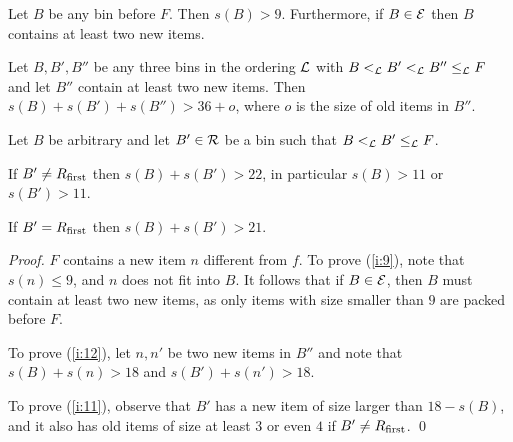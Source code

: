 \begin{lem}
\label{l:aux}
\begin{compactenum}[(i)]
\item
\label{i:9}
Let $B$ be any bin before $F$. Then $s(B)>9$. Furthermore, if
$B\in{\mathcal E}$ then $B$ contains at least two new items.
\item
\label{i:12}
Let $B,B',B''$ be any three bins in the ordering ${\mathcal L}$ with
$B <_{{\mathcal L}} B' <_{{\mathcal L}} B'' \leq_{{\mathcal L}} F$ and let $B''$ contain at least two new items. Then
$s(B)+s(B')+s(B'')>36+o$, where $o$ is the size of old items in $B''$.
\item  
\label{i:11}
Let $B$ be arbitrary and let $B'\in{\mathcal R}$ be a bin such that $B <_{{\mathcal L}} B' \leq_{{\mathcal L}} F$.

If $B'\neq R_{\mbox{\rm\scriptsize first}}$ then $s(B)+s(B')>22$, in
particular $s(B)>11$ or $s(B')>11$.

If $B'=R_{\mbox{\rm\scriptsize first}}$ then $s(B)+s(B')>21$.
\end{compactenum}
\end{lem}

\begin{proof}
$F$ contains a new item $n$ different from $f$. To prove (\ref{i:9}),
  note that $s(n)\leq 9$, and $n$ does not fit into $B$. It follows
  that if $B\in{\mathcal E}$, then $B$ must contain at least two new items,
  as only items with size smaller than $9$ are packed before $F$.

To prove (\ref{i:12}), let $n,n'$ be two new items in $B''$ and note
that $s(B)+s(n)>18$ and $s(B')+s(n')>18$.

To prove (\ref{i:11}), observe that $B'$ has a new
item of size larger than $18-s(B)$, and it also has old items of size
at least $3$ or even $4$ if $B'\neq R_{\mbox{\rm\scriptsize first}}$.
\qed
\end{proof}

